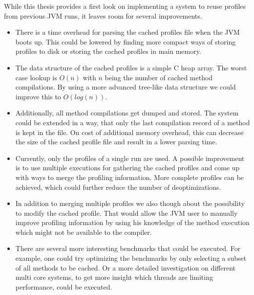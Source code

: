 While this thesis provides a first look on implementing a system to reuse profiles from previous JVM runs, it leaves room for several improvements.
\begin{itemize}
  \item There is a time overhead for parsing the cached profiles file when the JVM boots up. This could be lowered by finding more compact ways of storing profiles to disk or storing the cached profiles in main memory.
  \item The data structure of the cached profiles is a simple C heap array. The worst case lookup is $O(n)$ with $n$ being the number of cached method compilations. By using a more advanced tree-like data structure we could improve this to $O(log(n))$.
  \item Additionally, all method compilations get dumped and stored. The system could be extended in a way, that only the last compilation record of a method is kept in the file. On cost of additional memory overhead, this can decrease the size of the cached profile file and result in a lower parsing time.
  \item Currently, only the profiles of a single run are used. A possible improvement is to use multiple executions for gathering the cached profiles and come up with ways to merge the profiling information. More complete profiles can be achieved, which could further reduce the number of deoptimizations.
  \item In addition to merging multiple profiles we also though about the possibility to modify the cached profile. That would allow the JVM user to manually improve profiling information by using his knowledge of the method execution which might not be available to the compiler.
  \item There are several more interesting benchmarks that could be executed. For example, one could try optimizing the benchmarks by only selecting a subset of all methods to be cached. Or a more detailed investigation on different multi core systems, to get more insight which threads are limiting performance, could be executed.
\end{itemize}
